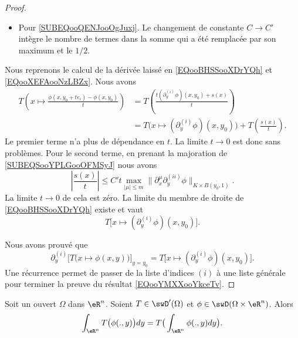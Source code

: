 \begin{proof}
\begin{subproof}
\begin{itemize}
			\item Pour \eqref{SUBEQooQENJooOgJuxj}. Le changement de constante \( C\to C'\) intègre le nombre de termes dans la somme qui a été remplacée par son maximum et le \( 1/2\).
		\end{itemize}
		Nous reprenons le calcul de la dérivée laissé en \eqref{EQooBHSSooXDrYQh} et \eqref{EQooXEFAooNzLBZx}. Nous avons
		\begin{subequations}
			\begin{align}
				T\left( x\mapsto\frac{ \phi(x,y_0+te_i)-\phi(x,y_0) }{ t } \right) & =T\left( \frac{ t(\partial_y^{(i)}\phi)(x,y_0)+s(x) }{ t }\right)                        \\
				                                                                   & =T\Big( x\mapsto (\partial_y^{(i)}\phi)(x,y_0) \Big)+T\left( \frac{ s(x) }{ t } \right).
			\end{align}
		\end{subequations}
		Le premier terme n'a plus de dépendance en \( t\). La limite \( t\to 0\) est donc sans problèmes. Pour le second terme, en prenant la majoration de \eqref{SUBEQSooYPLGooOFMSyJ} nous avons
		\begin{equation}
			| \frac{ s(x) }{ t } |\leq C't\max_{| \mu |\leq m}\| \partial_x^{\mu}\partial_y^{(ii)}\phi \|_{K\times \overline{ B(y_0,1) }}.
		\end{equation}
		La limite \( t\to 0\) de cela est zéro.
		\spitem[Conclusion]
		La limite du membre de droite de \eqref{EQooBHSSooXDrYQh} existe et vaut
		\begin{equation}
			T\Big[x\mapsto (\partial_y^{(i)}\phi)(x,y_0) \Big].
		\end{equation}
	\end{subproof}
	Nous avons prouvé que
	\begin{equation}
		\partial^{(i)}_y\Big[ T\big( x\mapsto\phi(x,y) \big) \Big]_{y=y_0}=T\Big[ x\mapsto (\partial^{(i)}_y\phi)(x,y_0) \Big].
	\end{equation}
	Une récurrence permet de passer de la liste d'indices \( (i)\) à une liste générale pour terminer la preuve du résultat \eqref{EQooYMXXooYkceTv}.
\end{proof}

\begin{theorem}
	Soit un ouvert \( \Omega\) dans \( \eR^n\). Soient \( T\in \swD'(\Omega)\) et \( \phi\in \swD(\Omega\times \eR^n)\). Alors
	\begin{equation}
		\int_{\eR^n}T\big( \phi(.,y) \big)dy=T\big( \int_{\eR^n}\phi(.,y)dy \big).
	\end{equation}
\end{theorem}

